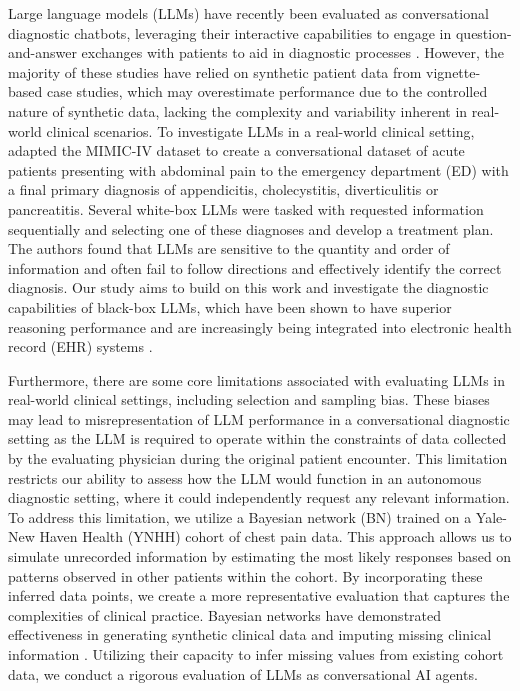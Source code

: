 Large language models (LLMs) have recently been evaluated as conversational diagnostic chatbots, leveraging their interactive capabilities to engage in question-and-answer exchanges with patients to aid in diagnostic processes \cite{tuConversationalDiagnosticAI2024, johriCRAFTMDConversationalEvaluation2024, zhangChatbotBasedQuestion2024}. However, the majority of these studies have relied on synthetic patient data from vignette-based case studies, which may overestimate performance due to the controlled nature of synthetic data, lacking the complexity and variability inherent in real-world clinical scenarios. To investigate LLMs in a real-world clinical setting, \citet{hagerEvaluationMitigationLimitations2024} adapted the MIMIC-IV dataset\citep{johnsonMIMICIVFreelyAccessible2023} to create a conversational dataset of acute patients presenting with abdominal pain to the emergency department (ED) with a final primary diagnosis of appendicitis, cholecystitis, diverticulitis or pancreatitis. Several white-box LLMs were tasked with requested information sequentially and selecting one of these diagnoses and develop a treatment plan. The authors found that LLMs are sensitive to the quantity and order of information and often fail to follow directions and effectively identify the correct diagnosis. Our study aims to build on this work and investigate the diagnostic capabilities of black-box LLMs, which have been shown to have superior reasoning performance and are increasingly being integrated into electronic health record (EHR) systems \citep{MicrosoftEpicAzureOpenAI2023}. 

Furthermore, there are some core limitations associated with evaluating LLMs in real-world clinical settings, including selection\citep{hammerAvoidingBiasObservational2009} and sampling bias\citep{jagerWhereLookMost2020}. These biases may lead to misrepresentation of LLM performance in a conversational diagnostic setting as the LLM is required to operate within the constraints of data collected by the evaluating physician during the original patient encounter. This limitation restricts our ability to assess how the LLM would function in an autonomous diagnostic setting, where it could independently request any relevant information. To address this limitation, we utilize a Bayesian network (BN) trained on a Yale-New Haven Health (YNHH) cohort of chest pain data. This approach allows us to simulate unrecorded information by estimating the most likely responses based on patterns observed in other patients within the cohort. By incorporating these inferred data points, we create a more representative evaluation that captures the complexities of clinical practice. Bayesian networks have demonstrated effectiveness in generating synthetic clinical data \citep{debenedettiPracticalLessonsGenerating2020, kaurApplicationBayesianNetworks2021} and imputing missing clinical information \citep{samboBayesianNetworkProbabilistic2015}. Utilizing their capacity to infer missing values from existing cohort data, we conduct a rigorous evaluation of LLMs as conversational AI agents.

